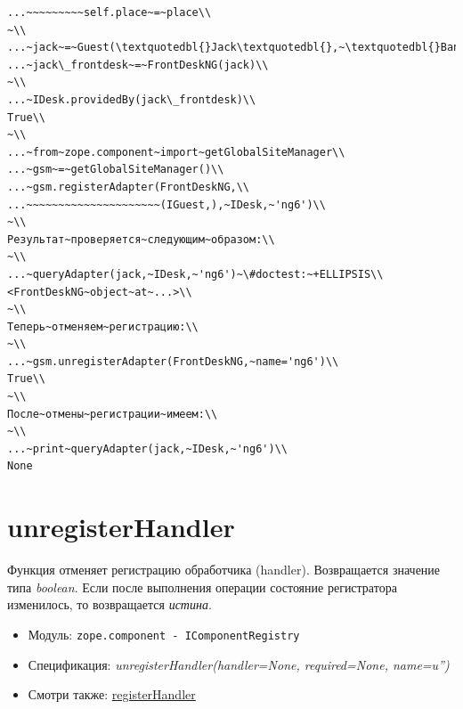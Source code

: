 \documentclass[a4paper,openany,twoside,draft]{book}
\providecommand*{\DUroletitlereference}[1]{\textsl{#1}}
\begin{document}
\begin{verbatim}
...~~~~~~~~~self.place~=~place\\
~\\
...~jack~=~Guest(\textquotedbl{}Jack\textquotedbl{},~\textquotedbl{}Bangalore\textquotedbl{})\\
...~jack\_frontdesk~=~FrontDeskNG(jack)\\
~\\
...~IDesk.providedBy(jack\_frontdesk)\\
True\\
~\\
...~from~zope.component~import~getGlobalSiteManager\\
...~gsm~=~getGlobalSiteManager()\\
...~gsm.registerAdapter(FrontDeskNG,\\
...~~~~~~~~~~~~~~~~~~~~~(IGuest,),~IDesk,~'ng6')\\
~\\
Результат~проверяется~следующим~образом:\\
~\\
...~queryAdapter(jack,~IDesk,~'ng6')~\#doctest:~+ELLIPSIS\\
<FrontDeskNG~object~at~...>\\
~\\
Теперь~отменяем~регистрацию:\\
~\\
...~gsm.unregisterAdapter(FrontDeskNG,~name='ng6')\\
True\\
~\\
После~отмены~регистрации~имеем:\\
~\\
...~print~queryAdapter(jack,~IDesk,~'ng6')\\
None
\end{verbatim}


\section*{unregisterHandler%
  \label{unregisterhandler}%
}

Функция отменяет регистрацию обработчика (handler). Возвращается
значение типа \DUroletitlereference{boolean}.  Если после выполнения операции состояние
регистратора изменилось, то возвращается \DUroletitlereference{истина}.

\begin{itemize}

\item Модуль: \texttt{zope.component - IComponentRegistry}

\item Спецификация: \DUroletitlereference{unregisterHandler(handler=None, required=None,
name=u'')}

\item Смотри также: \hyperref[registerhandler]{registerHandler}

\end{itemize}
\end{document}
